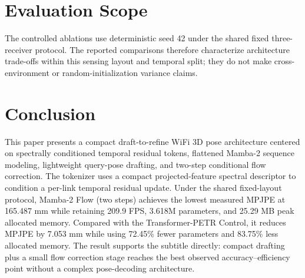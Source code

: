 \documentclass[conference,onecolumn]{IEEEtran}
\begin{document}
\begin{table}[!t]
\centering
\caption{Evidence map for the controlled architecture ladder. Effect sizes are derived from Tables~\ref{tab:main} and~\ref{tab:flow}; lower MPJPE and matched MPJPE are better, while higher FPS is better.}
\label{tab:hypothesis-verdict}
\end{table}

\section{Evaluation Scope}
The controlled ablations use deterministic seed 42 under the shared fixed three-receiver protocol. The reported comparisons therefore characterize architecture trade-offs within this sensing layout and temporal split; they do not make cross-environment or random-initialization variance claims.

\section{Conclusion}
This paper presents a compact draft-to-refine WiFi 3D pose architecture centered on spectrally conditioned temporal residual tokens, flattened Mamba-2 sequence modeling, lightweight query-pose drafting, and two-step conditional flow correction. The tokenizer uses a compact projected-feature spectral descriptor to condition a per-link temporal residual update. Under the shared fixed-layout protocol, Mamba-2 Flow (two steps) achieves the lowest measured MPJPE at 165.487 mm while retaining 209.9 FPS, 3.618M parameters, and 25.29 MB peak allocated memory. Compared with the Transformer-PETR Control, it reduces MPJPE by 7.053 mm while using 72.45\% fewer parameters and 83.75\% less allocated memory. The result supports the subtitle directly: compact drafting plus a small flow correction stage reaches the best observed accuracy--efficiency point without a complex pose-decoding architecture.
\end{document}
